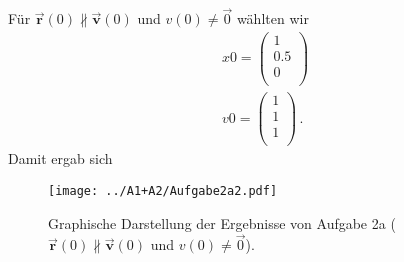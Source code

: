 Für $\vec{\textbf{r}}(0) \nparallel \vec{\textbf{v}}(0)$ und $v(0) \neq \vec{0}$ wählten wir
\begin{equation*}
	\begin{split}
		&x0 =
		 \begin{pmatrix}
			1\\
			0.5\\
			0 \\
		\end{pmatrix} \\
		& v0 = 
		\begin{pmatrix}
		1 \\
		1 \\
		1 \\
		\end{pmatrix}\,.
	\end{split}
\end{equation*}
Damit ergab sich
\begin{landscape}
	\begin{figure}
		\texttt{[image: ../A1+A2/Aufgabe2a2.pdf]}
		\caption{Graphische Darstellung der Ergebnisse von Aufgabe 2a ( $\vec{\textbf{r}}(0) \nparallel \vec{\textbf{v}}(0)$ und $v(0) \neq \vec{0}$).}
		\label{fig:a22}
	\end{figure}
\end{landscape}





